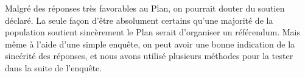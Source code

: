 \documentclass[a5paper,french]{memoir}
\begin{document}
Malgré des réponses très favorables au Plan, on pourrait douter du soutien déclaré. 
La seule façon d'être absolument certains qu'une majorité de la population soutient sincèrement le Plan serait d'organiser un référendum. Mais même à l'aide d'une simple enquête, on peut avoir une bonne indication de la sincérité des réponses, et nous avons utilisé plusieurs méthodes pour la tester dans la suite de l'enquête.
\end{document}
